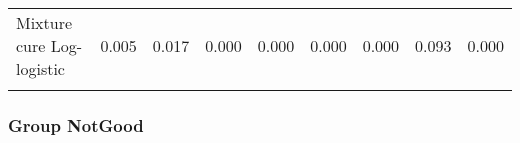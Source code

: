 \documentclass[
]{article}
\begin{document}
\begin{table}[H]
{\begin{tabular}[t]{lrrrrrrrr}
Mixture cure Log-logistic & 0.005 & 0.017 & 0.000 & 0.000 & 0.000 & 0.000 & 0.093 & 0.000\\
\cellcolor{gray!10}{Non-mixture cure Log-logistic} & \cellcolor{gray!10}{0.005} & \cellcolor{gray!10}{0.017} & \cellcolor{gray!10}{0.000} & \cellcolor{gray!10}{0.000} & \cellcolor{gray!10}{0.000} & \cellcolor{gray!10}{0.000} & \cellcolor{gray!10}{0.093} & \cellcolor{gray!10}{0.000}\\
\bottomrule
\end{tabular}}
\end{table}

\clearpage

\subsubsection{Group NotGood}\label{group-notgood}
\end{document}
